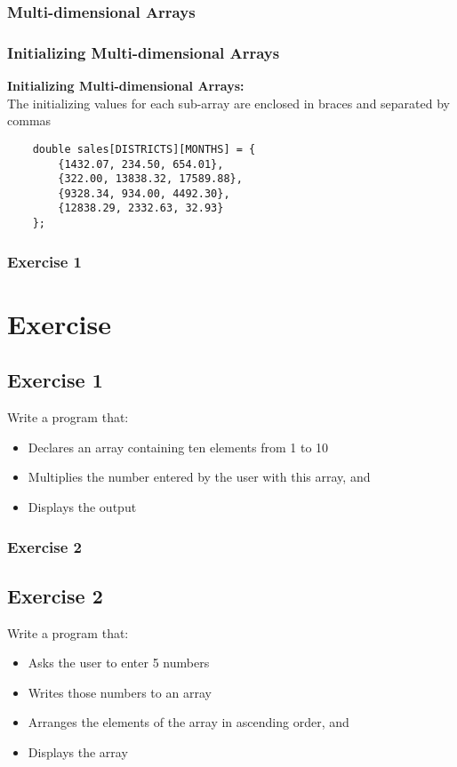 \documentclass{beamer}
\begin{document}
\begin{frame}[fragile]\frametitle{Multi-dimensional Arrays}
    \subsubsection{Initializing Multi-dimensional Arrays} %
    \label{ssub:initializing_multi_dimensional_arrays}
    \textbf{Initializing Multi-dimensional Arrays:} \\
    The initializing values for each sub-array are enclosed in braces and separated by commas
    \lstset{style=mystyle}
            \begin{lstlisting}
    double sales[DISTRICTS][MONTHS] = {
        {1432.07, 234.50, 654.01},
        {322.00, 13838.32, 17589.88},
        {9328.34, 934.00, 4492.30},
        {12838.29, 2332.63, 32.93}
    };
\end{lstlisting}
\end{frame}

\begin{frame}\frametitle{Exercise 1}
\section{Exercise} %
\label{sec:exercise}
\subsection{Exercise 1} %
\label{sub:exercise_1}
Write a program that:
\begin{itemize}
    \item Declares an array containing ten elements from 1 to 10
    \item Multiplies the number entered by the user with this array, and
    \item Displays the output
\end{itemize}
\end{frame}

\begin{frame}\frametitle{Exercise 2}
\subsection{Exercise 2} %
\label{sub:exercise_2}
Write a program that:
\begin{itemize}
    \item Asks the user to enter 5 numbers
    \item Writes those numbers to an array
    \item Arranges the elements of the array in ascending order, and
    \item Displays the array
\end{itemize}
\end{frame}
\end{document}
